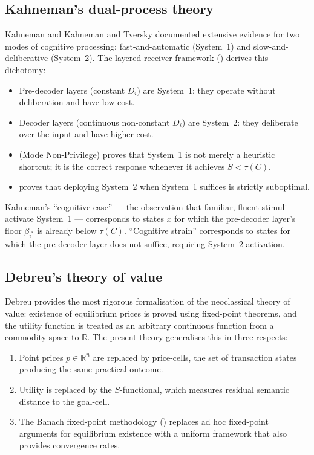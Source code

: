 \documentclass[twocolumn,11pt,a4paper]{article}
\newcommand{\R}{\mathbb{R}}
\begin{document}
\subsection{Kahneman's dual-process theory}
\label{sec:lit:kahneman}

Kahneman \cite{kahneman2011} and Kahneman and Tversky \cite{kahnemantversky1979}
documented extensive evidence for two modes of cognitive processing:
fast-and-automatic (System~1) and slow-and-deliberative (System~2).
The layered-receiver framework () derives this
dichotomy:

\begin{itemize}[leftmargin=*]
  \item Pre-decoder layers (constant $D_i$) are System~1: they operate
    without deliberation and have low cost.
  \item Decoder layers (continuous non-constant $D_i$) are System~2:
    they deliberate over the input and have higher cost.
  \item {} (Mode Non-Privilege) proves that
    System~1 is not merely a heuristic shortcut; it is the correct
    response whenever it achieves $S<\tau(C)$.
  \item {} proves that deploying System~2
    when System~1 suffices is strictly suboptimal.
\end{itemize}

Kahneman's ``cognitive ease'' — the observation that familiar, fluent
stimuli activate System~1 — corresponds to states $x$ for which the
pre-decoder layer's floor $\beta_{i^*}$ is already below $\tau(C)$.
``Cognitive strain'' corresponds to states for which the pre-decoder
layer does not suffice, requiring System~2 activation.

\subsection{Debreu's theory of value}
\label{sec:lit:debreu}

Debreu \cite{debreu1959} provides the most rigorous formalisation of the
neoclassical theory of value: existence of equilibrium prices is proved
using fixed-point theorems, and the utility function is treated as an
arbitrary continuous function from a commodity space to $\R$.  The present
theory generalises this in three respects:

\begin{enumerate}[label=(\roman*),leftmargin=*]
  \item Point prices $p\in\R^n$ are replaced by price-cells, the set of
    transaction states producing the same practical outcome.
  \item Utility is replaced by the $S$-functional, which measures residual
    semantic distance to the goal-cell.
  \item The Banach fixed-point methodology () replaces
    ad hoc fixed-point arguments for equilibrium existence with a
    uniform framework that also provides convergence rates.
\end{enumerate}
\end{document}

